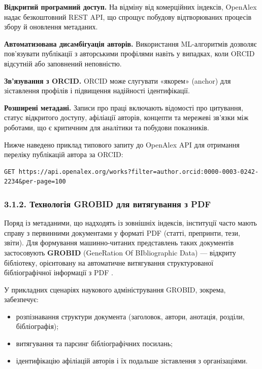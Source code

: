 \textbf{Відкритий програмний доступ.} На відміну від комерційних індексів, OpenAlex надає безкоштовний REST API, що спрощує побудову відтворюваних процесів збору й оновлення метаданих.

\textbf{Автоматизована дисамбігуація авторів.} Використання ML-алгоритмів дозволяє пов'язувати публікації з авторськими профілями навіть у випадках, коли ORCID відсутній або заповнений неповністю.

\textbf{Зв'язування з ORCID.} ORCID може слугувати «якорем» (anchor) для зіставлення профілів і підвищення надійності ідентифікації.

\textbf{Розширені метадані.} Записи про праці включають відомості про цитування, статус відкритого доступу, афіліації авторів, концепти та мережеві зв'язки між роботами, що є критичним для аналітики та побудови показників.

Нижче наведено приклад типового запиту до OpenAlex API для отримання переліку публікацій автора за ORCID:

\begin{lstlisting}
GET https://api.openalex.org/works?filter=author.orcid:0000-0003-0242-2234&per-page=100
\end{lstlisting}

\subsubsection*{3.1.2. Технологія GROBID для витягування з PDF}

Поряд із метаданими, що надходять із зовнішніх індексів, інституції часто мають справу з первинними документами у форматі PDF (статті, препринти, тези, звіти). Для формування машинно-читаних представлень таких документів застосовують \textbf{GROBID} (GeneRation Of BIbliographic Data) --- відкриту бібліотеку, орієнтовану на автоматичне витягування структурованої бібліографічної інформації з PDF \cite{Lopez2015GROBID}.

У прикладних сценаріях наукового адміністрування GROBID, зокрема, забезпечує:
\begin{itemize}[leftmargin=*,itemsep=0.2em]
\item розпізнавання структури документа (заголовок, автори, анотація, розділи, бібліографія);
\item витягування та парсинг бібліографічних посилань;
\item ідентифікацію афіліацій авторів і їх подальше зіставлення з організаціями.
\end{itemize}

